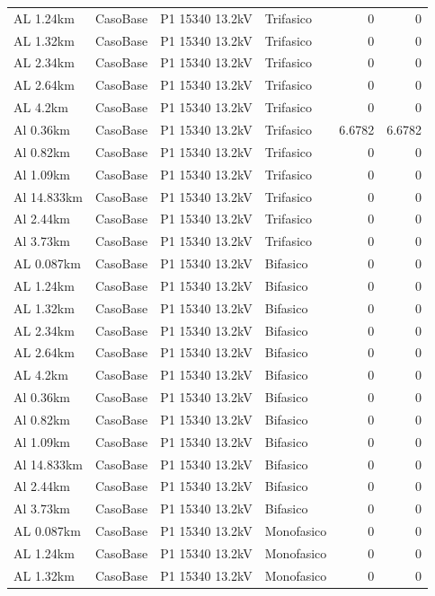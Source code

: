 \documentclass[11pt,a4paper]{article}
\begin{document}
\begin{longtable}{llllrr}
AL 1.24km & CasoBase & P1 15340 13.2kV & Trifasico & 0 & 0 \\
AL 1.32km & CasoBase & P1 15340 13.2kV & Trifasico & 0 & 0 \\
AL 2.34km & CasoBase & P1 15340 13.2kV & Trifasico & 0 & 0 \\
AL 2.64km & CasoBase & P1 15340 13.2kV & Trifasico & 0 & 0 \\
AL 4.2km & CasoBase & P1 15340 13.2kV & Trifasico & 0 & 0 \\
Al 0.36km & CasoBase & P1 15340 13.2kV & Trifasico & 6.6782 & 6.6782 \\
Al 0.82km & CasoBase & P1 15340 13.2kV & Trifasico & 0 & 0 \\
Al 1.09km & CasoBase & P1 15340 13.2kV & Trifasico & 0 & 0 \\
Al 14.833km & CasoBase & P1 15340 13.2kV & Trifasico & 0 & 0 \\
Al 2.44km & CasoBase & P1 15340 13.2kV & Trifasico & 0 & 0 \\
Al 3.73km & CasoBase & P1 15340 13.2kV & Trifasico & 0 & 0 \\
AL 0.087km & CasoBase & P1 15340 13.2kV & Bifasico & 0 & 0 \\
AL 1.24km & CasoBase & P1 15340 13.2kV & Bifasico & 0 & 0 \\
AL 1.32km & CasoBase & P1 15340 13.2kV & Bifasico & 0 & 0 \\
AL 2.34km & CasoBase & P1 15340 13.2kV & Bifasico & 0 & 0 \\
AL 2.64km & CasoBase & P1 15340 13.2kV & Bifasico & 0 & 0 \\
AL 4.2km & CasoBase & P1 15340 13.2kV & Bifasico & 0 & 0 \\
Al 0.36km & CasoBase & P1 15340 13.2kV & Bifasico & 0 & 0 \\
Al 0.82km & CasoBase & P1 15340 13.2kV & Bifasico & 0 & 0 \\
Al 1.09km & CasoBase & P1 15340 13.2kV & Bifasico & 0 & 0 \\
Al 14.833km & CasoBase & P1 15340 13.2kV & Bifasico & 0 & 0 \\
Al 2.44km & CasoBase & P1 15340 13.2kV & Bifasico & 0 & 0 \\
Al 3.73km & CasoBase & P1 15340 13.2kV & Bifasico & 0 & 0 \\
AL 0.087km & CasoBase & P1 15340 13.2kV & Monofasico & 0 & 0 \\
AL 1.24km & CasoBase & P1 15340 13.2kV & Monofasico & 0 & 0 \\
AL 1.32km & CasoBase & P1 15340 13.2kV & Monofasico & 0 & 0 \\

\end{longtable}
\end{document}
